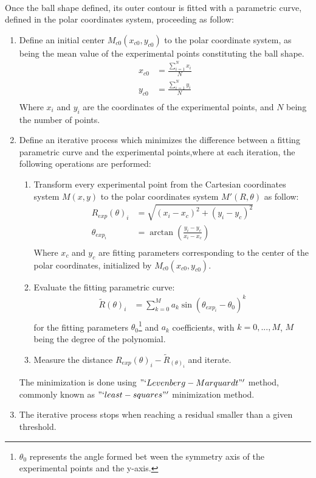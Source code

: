 \paragraph{}
Once the ball shape defined, its outer contour is fitted with a parametric curve, defined in the polar coordinates system, proceeding as follow:
\begin{enumerate}
	\item Define an initial center 	$M_{c0} (x_{c0},y_{c0})$	to the polar coordinate system, as being the mean value of the experimental points constituting the ball shape.
	\begin{align*}
			x_{c0} &= \frac{\sum\limits_{i=1}^N x_i}{N} \\
			y_{c0} &= \frac{\sum\limits_{i=1}^N y_i}{N} \\
	\end{align*}
	Where $x_i$ and $y_i$	are the coordinates of the experimental points, and	$N$	being the number of points.
	\item Define an iterative process which minimizes the difference between a fitting parametric curve and the experimental points,where at each iteration, the 		following operations are performed: 
	
		\begin{enumerate}[label=\alph*)]
			\item Transform every experimental point from the Cartesian coordinates system  $M(x,y)$ to the polar coordinates system $M'(R,\theta)$  as follow:
				\begin{align*}
				R_{exp}(\theta)_i &=\sqrt{(x_i- x_c)^2+(y_i-y_c)^2}  \\
				\theta_{exp_i} &= \arctan(\frac{y_i-y_c}{x_i- x_c}) \\
				\end{align*}
				Where $x_c$ and $y_c$ are fitting parameters corresponding to the center of the polar coordinates, initialized by $M_{c0} (x_{c0},y_{c0})$.
			\item Evaluate the fitting parametric curve:
				\begin{align*}
					\tilde{R}(\theta)_i &=\sum\limits_{k=0}^M a_k \sin(\theta_{exp_i}-\theta_0)^k  \\
				\end{align*}
				for the fitting parameters $\theta_0$\footnote{$\theta_0$ represents the angle formed bet ween the symmetry axis of the experimental points and the y-axis.} 			 and $a_k$ coefficients, with $k={0,...,M}$, $M$ being the degree of the polynomial.
			\item Measure the distance $R_{exp}(\theta)_i-\tilde{R}_(\theta)_i$ and iterate.
		\end{enumerate}
	The minimization is done using $"`Levenberg-Marquardt"'$ method, commonly known as $"`least-squares"'$ minimization method.
	\item The iterative process stops when reaching a residual smaller than a given threshold.	
\end{enumerate}
